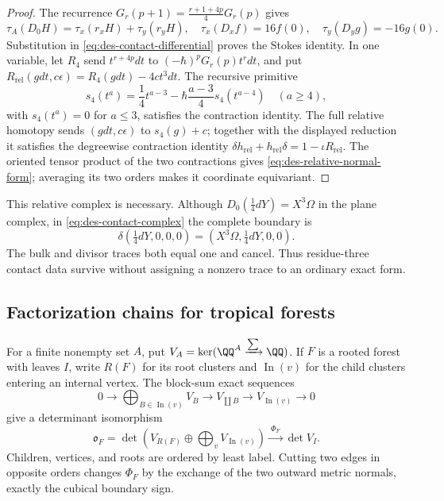 \begin{proof}
The recurrence
$G_r(p+1)=\frac{r+1+4p}{4}G_r(p)$ gives
\begin{equation}
 \tau_A(D_0H)=\tau_x(r_xH)+\tau_y(r_yH),\quad
 \tau_x(D_xf)=16f(0),\quad \tau_y(D_yg)=-16g(0).
 \label{eq:des-integration-by-parts}
\end{equation}
Substitution in \eqref{eq:des-contact-differential} proves the Stokes
identity.  In one variable, let $R_4$ send $t^{r+4p}dt$ to
$(-\hbar)^pG_r(p)t^r dt$, and put
$R_{\mathrm{rel}}(gdt,c\epsilon)=R_4(gdt)-4ct^3dt$.  The recursive primitive
\begin{equation}
 s_4(t^a)=\frac14t^{a-3}
 -\hbar\frac{a-3}{4}s_4(t^{a-4})\quad(a\geq4),
 \label{eq:des-one-variable-homotopy}
\end{equation}
with $s_4(t^a)=0$ for $a\leq3$, satisfies the contraction identity.  The
full relative homotopy sends $(gdt,c\epsilon)$ to $s_4(g)+c$; together with
the displayed reduction it satisfies the degreewise contraction identity
$\delta h_{\mathrm{rel}}+h_{\mathrm{rel}}\delta
=1-\iota R_{\mathrm{rel}}$.  The oriented tensor product of the two contractions gives
\eqref{eq:des-relative-normal-form}; averaging its two orders makes it
coordinate equivariant.
\end{proof}

This relative complex is necessary.  Although
$D_0(\frac14dY)=X^3\Omega$ in the plane complex, in
\eqref{eq:des-contact-complex} the complete boundary is
\begin{equation}
 \delta(\tfrac14dY,0,0,0)
 =(X^3\Omega,\tfrac14dY,0,0).
 \label{eq:des-residue-three}
\end{equation}
The bulk and divisor traces both equal one and cancel.  Thus residue-three
contact data survive without assigning a nonzero trace to an ordinary exact
form.

\subsection{Factorization chains for tropical forests}

For a finite nonempty set $A$, put
$V_A=\ker(\QQ^A\xrightarrow{\sum}\QQ)$.  If $F$ is a rooted forest with
leaves $I$, write $R(F)$ for its root clusters and
$\operatorname{In}(v)$ for the child clusters entering an internal vertex.
The block-sum exact sequences
\begin{equation}
 0\longrightarrow\bigoplus_{B\in\operatorname{In}(v)}V_B
 \longrightarrow V_{\coprod B}\longrightarrow
 V_{\operatorname{In}(v)}\longrightarrow0
 \label{eq:des-block-sum}
\end{equation}
give a determinant isomorphism
\begin{equation}
 \mathfrak o_F=
 \det\left(V_{R(F)}\oplus\bigoplus_{v}V_{\operatorname{In}(v)}\right)
 \xrightarrow{\ \Phi_F\ }\det V_I.
 \label{eq:des-forest-orientation}
\end{equation}
Children, vertices, and roots are ordered by least label.  Cutting two edges
in opposite orders changes $\Phi_F$ by the exchange of the two outward
metric normals, exactly the cubical boundary sign.

